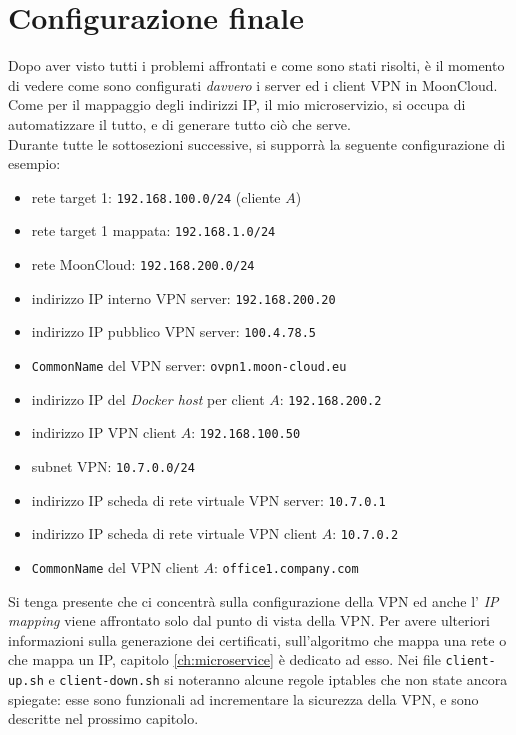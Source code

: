 \section{Configurazione finale}\label{sec:ending}
Dopo aver visto tutti i problemi affrontati e come sono stati risolti, è il
momento di vedere come sono configurati \textit{davvero} i server ed i client
VPN in MoonCloud. Come per il mappaggio degli indirizzi IP, il mio microservizio,
si occupa di automatizzare il tutto, e di generare tutto ciò che
serve.\\
Durante tutte le sottosezioni successive, si supporrà la seguente configurazione
di esempio:
\begin{itemize}
  \item rete target 1: \texttt{192.168.100.0/24} (cliente $A$)
  \item rete target 1 mappata: \texttt{192.168.1.0/24}
  \item rete MoonCloud: \texttt{192.168.200.0/24}
  \item indirizzo IP interno VPN server: \texttt{192.168.200.20}
  \item indirizzo IP pubblico VPN server: \texttt{100.4.78.5}
  \item \texttt{CommonName} del VPN server: \texttt{ovpn1.moon-cloud.eu}
  \item indirizzo IP del \textit{Docker host} per client $A$: \texttt{192.168.200.2}
  \item indirizzo IP VPN client $A$: \texttt{192.168.100.50}
  \item subnet VPN: \texttt{10.7.0.0/24}
  \item indirizzo IP scheda di rete virtuale VPN server: \texttt{10.7.0.1}
  \item indirizzo IP scheda di rete virtuale VPN client $A$: \texttt{10.7.0.2}
  \item \texttt{CommonName} del VPN client $A$: \texttt{office1.company.com}
\end{itemize}
Si tenga presente che ci concentrà sulla configurazione della VPN ed anche l'
\textit{IP mapping} viene affrontato solo dal punto di vista della VPN. Per avere ulteriori
informazioni sulla generazione dei certificati, sull'algoritmo che mappa una rete o che
mappa un IP, capitolo \ref{ch:microservice} è dedicato ad esso.
Nei file \texttt{client-up.sh} e \texttt{client-down.sh} si noteranno alcune regole iptables
che non state ancora spiegate: esse sono funzionali ad incrementare la sicurezza della VPN,
e sono descritte nel prossimo capitolo.

